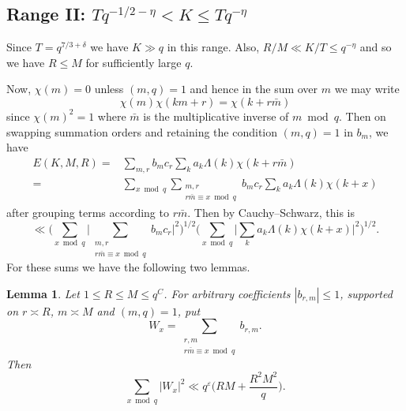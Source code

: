 \documentclass[12pt, oneside]{amsart}
\newtheorem{lem}[prop]{Lemma}
\theoremstyle{definition}
\newcommand{\leqs}{\leqslant }
\newcommand{\eps}{\varepsilon}
\newcommand{\1}{\mathds{1}}
\begin{document}
\subsection{Range II: $Tq^{-1/2-\eta}<K\leqs Tq^{-\eta}$} Since $T=q^{7/3+\delta}$  we have $K\gg q$ in this range.  Also, 
$R/M\ll K/T\leqs q^{-\eta}$ and so we have $R\leqs M$ for sufficiently large $q$.  

Now,
$\chi(m)=0$ unless $(m,q)=1$ and hence in the sum over $m$ we may write
\begin{equation*}
 \chi(m)\chi(km+r)=\chi(k+r\bar m)
\end{equation*}
since $\chi(m)^2=1$ where $\bar m$ is the multiplicative inverse of $m\bmod q$. Then on swapping summation orders and retaining the condition $(m,q)=1$ in $b_m$, we have 
\begin{align*}
E(K,M,R)
= &
\sum_{m,r}b_mc_r\sum_k a_k\Lambda(k)\chi(k+r\bar m)
\\
= &
\sum_{x\bmod q}\sum_{\substack{m,r\\ r\bar m\equiv x\bmod q}}b_mc_r
\sum_k a_k\Lambda(k)\chi(k+x)
\end{align*}
after grouping terms according to $r\bar m$. Then by Cauchy--Schwarz, this is 
\begin{equation}\label{CS}
\ll 
\bigg(\sum_{x\bmod q}\bigg|\sum_{\substack{m,r\\ r\bar m\equiv x\bmod q}}b_mc_r\bigg|^2\bigg)^{1/2}
\bigg(\sum_{x\bmod q}\bigg|\sum_{k}a_k\Lambda(k)\chi(k+x)\bigg|^2\bigg)^{1/2}.
\end{equation}
For these sums we have the following two lemmas. 

\begin{lem}
Let $1\leqs R\leqs M\leqs q^C$.  For arbitrary coefficients
$|b_{r,m}|\leqs1$, supported on $r\asymp R$, $m\asymp M$ and $(m,q)=1$, put
\[
 W_x=\sum_{\substack{r,m\\r\bar m\equiv x\bmod q}}b_{r,m}.
\]
Then
\begin{equation}
 \sum_{x\bmod q}|W_x|^2
 \ll
 q^\eps\bigg(RM+\frac{R^2M^2}{q}\bigg).
 \label{eq:energy}
\end{equation}
\end{lem}
\end{document}
